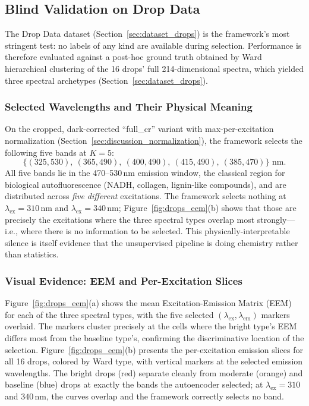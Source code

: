 \subsection{Blind Validation on Drop Data}
\label{sec:results_drops}

The Drop Data dataset (Section~\ref{sec:dataset_drops}) is the framework's most stringent test: no labels of any kind are available during selection.
Performance is therefore evaluated against a post-hoc ground truth obtained by Ward hierarchical clustering of the 16 drops' full 214-dimensional spectra, which yielded three spectral archetypes (Section~\ref{sec:dataset_drops}).

\subsubsection{Selected Wavelengths and Their Physical Meaning}
On the cropped, dark-corrected ``full\_cr'' variant with max-per-excitation normalization (Section~\ref{sec:discussion_normalization}), the framework selects the following five bands at $K=5$:
\begin{equation*}
\{(325, 530),\ (365, 490),\ (400, 490),\ (415, 490),\ (385, 470)\} \text{ nm.}
\end{equation*}
All five bands lie in the 470--530\,nm emission window, the classical region for biological autofluorescence (NADH, collagen, lignin-like compounds), and are distributed across \emph{five different} excitations.
The framework selects nothing at $\lambda_{\text{ex}} = 310$\,nm and $\lambda_{\text{ex}} = 340$\,nm; Figure~\ref{fig:drops_eem}(b) shows that those are precisely the excitations where the three spectral types overlap most strongly---i.e., where there is no information to be selected.
This physically-interpretable silence is itself evidence that the unsupervised pipeline is doing chemistry rather than statistics.

\subsubsection{Visual Evidence: EEM and Per-Excitation Slices}
Figure~\ref{fig:drops_eem}(a) shows the mean Excitation-Emission Matrix (EEM) for each of the three spectral types, with the five selected $(\lambda_{\text{ex}}, \lambda_{\text{em}})$ markers overlaid.
The markers cluster precisely at the cells where the bright type's EEM differs most from the baseline type's, confirming the discriminative location of the selection.
Figure~\ref{fig:drops_eem}(b) presents the per-excitation emission slices for all 16 drops, colored by Ward type, with vertical markers at the selected emission wavelengths.
The bright drops (red) separate cleanly from moderate (orange) and baseline (blue) drops at exactly the bands the autoencoder selected; at $\lambda_{\text{ex}} = 310$ and $340$\,nm, the curves overlap and the framework correctly selects no band.

